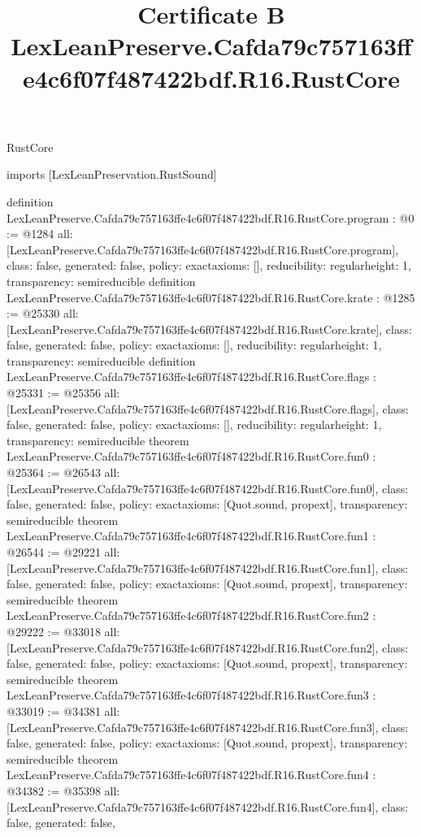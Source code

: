 \begin{lexlean}{RustCore}
\title{Certificate B LexLeanPreserve.Cafda79c757163ffe4c6f07f487422bdf.R16.RustCore}
\begin{coremodule}
imports [LexLeanPreservation.RustSound]

definition LexLeanPreserve.Cafda79c757163ffe4c6f07f487422bdf.R16.RustCore.program : @0 := @1284 {
  all: [LexLeanPreserve.Cafda79c757163ffe4c6f07f487422bdf.R16.RustCore.program],
  class: false,
  generated: false,
  policy: exact{axioms: []},
  reducibility: regular{height: 1},
  transparency: semireducible
}
definition LexLeanPreserve.Cafda79c757163ffe4c6f07f487422bdf.R16.RustCore.krate : @1285 := @25330 {
  all: [LexLeanPreserve.Cafda79c757163ffe4c6f07f487422bdf.R16.RustCore.krate],
  class: false,
  generated: false,
  policy: exact{axioms: []},
  reducibility: regular{height: 1},
  transparency: semireducible
}
definition LexLeanPreserve.Cafda79c757163ffe4c6f07f487422bdf.R16.RustCore.flags : @25331 := @25356 {
  all: [LexLeanPreserve.Cafda79c757163ffe4c6f07f487422bdf.R16.RustCore.flags],
  class: false,
  generated: false,
  policy: exact{axioms: []},
  reducibility: regular{height: 1},
  transparency: semireducible
}
theorem LexLeanPreserve.Cafda79c757163ffe4c6f07f487422bdf.R16.RustCore.fun0 : @25364 := @26543 {
  all: [LexLeanPreserve.Cafda79c757163ffe4c6f07f487422bdf.R16.RustCore.fun0],
  class: false,
  generated: false,
  policy: exact{axioms: [Quot.sound, propext]},
  transparency: semireducible
}
theorem LexLeanPreserve.Cafda79c757163ffe4c6f07f487422bdf.R16.RustCore.fun1 : @26544 := @29221 {
  all: [LexLeanPreserve.Cafda79c757163ffe4c6f07f487422bdf.R16.RustCore.fun1],
  class: false,
  generated: false,
  policy: exact{axioms: [Quot.sound, propext]},
  transparency: semireducible
}
theorem LexLeanPreserve.Cafda79c757163ffe4c6f07f487422bdf.R16.RustCore.fun2 : @29222 := @33018 {
  all: [LexLeanPreserve.Cafda79c757163ffe4c6f07f487422bdf.R16.RustCore.fun2],
  class: false,
  generated: false,
  policy: exact{axioms: [Quot.sound, propext]},
  transparency: semireducible
}
theorem LexLeanPreserve.Cafda79c757163ffe4c6f07f487422bdf.R16.RustCore.fun3 : @33019 := @34381 {
  all: [LexLeanPreserve.Cafda79c757163ffe4c6f07f487422bdf.R16.RustCore.fun3],
  class: false,
  generated: false,
  policy: exact{axioms: [Quot.sound, propext]},
  transparency: semireducible
}
theorem LexLeanPreserve.Cafda79c757163ffe4c6f07f487422bdf.R16.RustCore.fun4 : @34382 := @35398 {
  all: [LexLeanPreserve.Cafda79c757163ffe4c6f07f487422bdf.R16.RustCore.fun4],
  class: false,
  generated: false,
}
\end{coremodule}
\end{lexlean}
